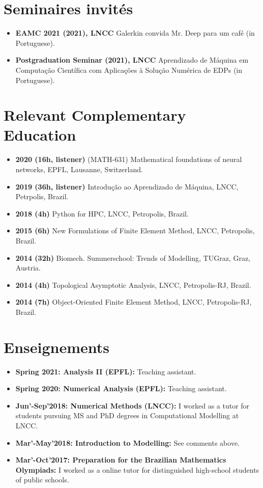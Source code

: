 \documentclass[french]{article}
\begin{document}
\section{Seminaires invités}
\begin{itemize}
	\item \textbf{EAMC 2021 (2021), LNCC} Galerkin convida Mr. Deep para um café (in Portuguese).
	\item \textbf{Postgraduation Seminar (2021), LNCC} Aprendizado de Máquina em Computação Científica com Aplicações à Solução Numérica de EDPs (in Portuguese).
\end{itemize}

\section{Relevant Complementary Education}
\begin{itemize}
\item \textbf{2020 (16h, listener)} (MATH-631) Mathematical foundations of neural networks, EPFL, Lausanne, Switzerland.
\item \textbf{2019 (36h, listener)} Introdução ao Aprendizado de Máquina, LNCC, Petrpolis, Brazil.
\item \textbf{2018 (4h)} Python for HPC, LNCC, Petropolis, Brazil.
\item \textbf{2015 (6h) } New Formulations of Finite Element Method, LNCC, Petropolis, Brazil.
\item \textbf{2014 (32h) } Biomech. Summerschool: Trends of Modelling, TUGraz, Graz, Austria.
\item \textbf{2014 (4h) } Topological Asymptotic Analysis, LNCC, Petropolis-RJ, Brazil. 
\item \textbf{2014 (7h) } Object-Oriented Finite Element Method, LNCC, Petropolis-RJ, Brazil.
\end{itemize}

\section{Enseignements}
\begin{itemize}
\item \textbf{Spring 2021: Analysis II (EPFL):} Teaching assistant.
\item \textbf{Spring 2020: Numerical Analysis (EPFL):} Teaching assistant.
\item \textbf{Jun'-Sep'2018: Numerical Methods (LNCC):} I worked as a tutor for students pursuing MS and PhD degrees in Computational Modelling at LNCC.
\item \textbf{Mar'-May'2018: Introduction to Modelling:} See comments above.
\item \textbf{Mar'-Oct'2017: Preparation for the Brazilian Mathematics Olympiads:} I worked as a online tutor for distinguished high-school students of public schools.
\end{itemize}
\end{document}
